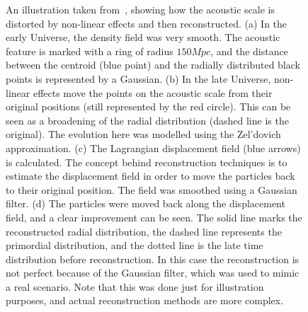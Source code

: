 \begin{figure}
    \caption{
      \small
    An illustration taken from~\cite{2012MNRAS.427.2132P}, showing how the acoustic scale is distorted by non-linear effects and then reconstructed. (a) In the early Universe, the density field was very smooth. The acoustic feature is marked with a ring of radius $150Mpc$, and the distance between the centroid (blue point) and the radially distributed black points is represented by a Gaussian. (b) In the late Universe, non-linear effects move the points on the acoustic scale from their original positions (still represented by the red circle). This can be seen as a broadening of the radial distribution (dashed line is the original). The evolution here was modelled using the Zel'dovich approximation. (c) The Lagrangian displacement field (blue arrows) is calculated. The concept behind reconstruction techniques is to estimate the displacement field in order to move the particles back to their original position. The field was smoothed using a Gaussian filter. (d) The particles were moved back along the displacement field, and a clear improvement can be seen. The solid line marks the reconstructed radial distribution, the dashed line represents the primordial distribution, and the dotted line is the late time distribution before reconstruction. In this case the reconstruction is not perfect because of the Gaussian filter, which was used to mimic a real scenario. Note that this was done just for illustration purposes, and actual reconstruction methods are more complex.
    }
    
\label{fig:3}
\end{figure}



